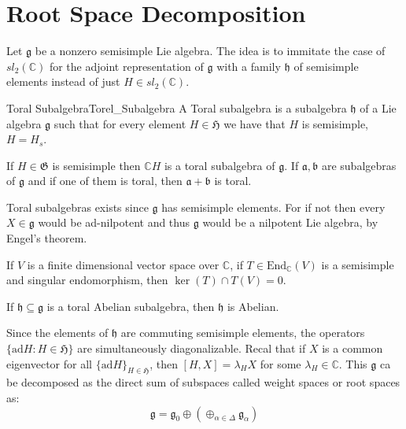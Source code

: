 \section{Root Space Decomposition}
    Let $\mathfrak{g}$ be a nonzero semisimple Lie algebra. The idea is to
    immitate the case of $sl_{2}(\mathbb{C})$ for the adjoint representation
    of $\mathfrak{g}$ with a family $\mathfrak{h}$ of semisimple elements
    instead of just $H\in{sl}_{2}(\mathbb{C})$.
    \begin{fdefinition}{Toral Subalgebra}{Torel_Subalgebra}
        A Toral subalgebra is a subalgebra $\mathfrak{h}$ of a Lie algebra
        $\mathfrak{g}$ such that for every element $H\in\mathfrak{H}$ we
        have that $H$ is semisimple, $H=H_{s}$.
    \end{fdefinition}
    \begin{theorem}
        If $H\in\mathfrak{G}$ is semisimple then $\mathbb{C}H$ is a toral
        subalgebra of $\mathfrak{g}$. If $\mathfrak{a},\mathfrak{b}$ are
        subalgebras of $\mathfrak{g}$ and if one of them is toral, then
        $\mathfrak{a}+\mathfrak{b}$ is toral.
    \end{theorem}
    Toral subalgebras exists since $\mathfrak{g}$ has semisimple elements.
    For if not then every $X\in\mathfrak{g}$ would be ad-nilpotent and thus
    $\mathfrak{g}$ would be a nilpotent Lie algebra, by Engel's theorem.
    \begin{theorem}
        If $V$ is a finite dimensional vector space over $\mathbb{C}$, if
        $T\in\textrm{End}_{\mathbb{C}}(V)$ is a semisimple and singular
        endomorphism, then $\ker(T)\cap{T}(V)=0$.
    \end{theorem}
    \begin{theorem}
        If $\mathfrak{h}\subseteq\mathfrak{g}$ is a toral Abelian
        subalgebra, then $\mathfrak{h}$ is Abelian.
    \end{theorem}
    Since the elements of $\mathfrak{h}$ are commuting semisimple elements,
    the operators $\{\textrm{ad}H:H\in\mathfrak{H}\}$ are simultaneously
    diagonalizable. Recal that if $X$ is a common eigenvector for all
    $\{\textrm{ad}H\}_{H\in\mathfrak{H}}$, then $[H,X]=\lambda_{H}X$ for
    some $\lambda_{H}\in\mathbb{C}$. This $\mathfrak{g}$ ca be decomposed as
    the direct sum of subspaces called weight spaces or root spaces as:
    \begin{equation}
        \mathfrak{g}=\mathfrak{g}_{0}
        \oplus(\oplus_{\alpha\in\Delta}\mathfrak{g}_{\alpha})
    \end{equation}
